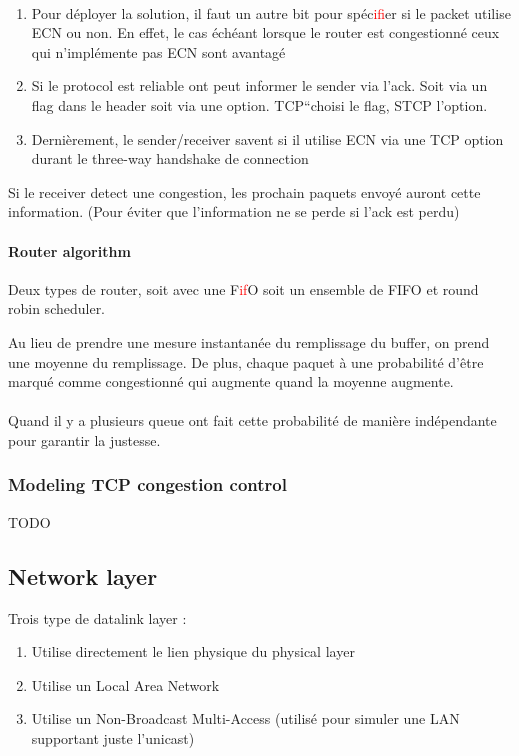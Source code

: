 \paragraph{}
\begin{enumerate}
    \item Pour déployer la solution, il faut un autre bit pour spéc\textcolor{red}{if}ier si le packet utilise
        ECN ou non. En effet, le cas échéant lorsque le router est congestionné ceux qui
        n'implémente pas ECN sont avantagé
    \item Si le protocol est reliable ont peut informer le sender via l'ack. Soit via
        un flag dans le header soit via une option. TCP``choisi le flag, STCP l'option.
    \item Dernièrement, le sender/receiver savent si il utilise ECN via une TCP option
        durant le three-way handshake de connection
\end{enumerate}

Si le receiver detect une congestion, les prochain paquets envoyé auront cette information.
(Pour éviter que l'information ne se perde si l'ack est perdu)

\paragraph{Router algorithm}
Deux types de router, soit avec une F\textcolor{red}{if}O soit un ensemble de FIFO et round robin scheduler.

Au lieu de prendre une mesure instantanée du remplissage du buffer, on prend une moyenne
du remplissage.
De plus, chaque paquet à une probabilité d'être marqué comme congestionné qui augmente
quand la moyenne augmente.

\paragraph{}
Quand il y a plusieurs queue ont fait cette probabilité de manière indépendante pour
garantir la justesse.

\subsubsection{Modeling TCP congestion control}
TODO

\subsection{Network layer}
Trois type de datalink layer :
\begin{enumerate}
    \item Utilise directement le lien physique du physical layer
    \item Utilise un Local Area Network
    \item Utilise un Non-Broadcast Multi-Access (utilisé pour simuler une LAN supportant
        juste l'unicast)
\end{enumerate}

